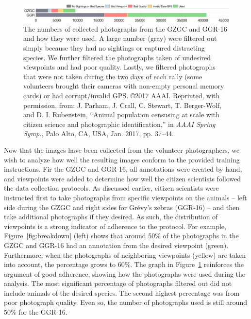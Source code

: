 \begin{figure}[!t]
    \begin{center}
        \hspace*{-0.2in}
        \includegraphics[width=1.0\linewidth]{resources/images-used-breakdown.pdf}
    \end{center}
    \caption{The numbers of collected photographs from the GZGC and GGR-16 and how they were used.  A large number (gray) were filtered out simply because they had no sightings or captured distracting species.  We further filtered the photographs taken of undesired viewpoints and had poor quality.  Lastly, we filtered photographs that were not taken during the two days of each rally (some volunteers brought their cameras with non-empty personal memory cards) or had corrupt/invalid GPS.  \copyright 2017 AAAI. Reprinted, with permission, from: J. Parham, J. Crall, C. Stewart, T. Berger-Wolf, and D. I. Rubenstein, ``Animal population censusing at scale with citizen science and photographic identification,'' in \textit{AAAI Spring Symp.}, Palo Alto, CA, USA, Jan. 2017, pp. 37–44.}
    \label{fig:breakdown-images-all}
\end{figure}

Now that the images have been collected from the volunteer photographers, we wish to analyze how well the resulting images conform to the provided training instructions.  Fir the GZGC and GGR-16, all annotations were created by hand, and viewpoints were added to determine how well the citizen scientists followed the data collection protocols.  As discussed earlier, citizen scientists were instructed first to take photographs from specific viewpoints on the animals -- left side during the GZGC and right sides for Gr\'evy's zebras (GGR-16) -- and then take additional photographs if they desired.  As such, the distribution of viewpoints is a strong indicator of adherence to the protocol. For example, Figure~\ref{fig:breakdown} (left) shows that around 50\% of the photographs in the GZGC and GGR-16 had an annotation from the desired viewpoint (green).  Furthermore, when the photographs of neighboring viewpoints (yellow) are taken into account, the percentage grows to 60\%.  The graph in Figure~\ref{fig:breakdown-images-all} reinforces the argument of good adherence, showing how the photographs were used during the analysis.  The most significant percentage of photographs filtered out did not include animals of the desired species.  The second highest percentage was from poor photograph quality.  Even so, the number of photographs used is still around 50\% for the GGR-16.


